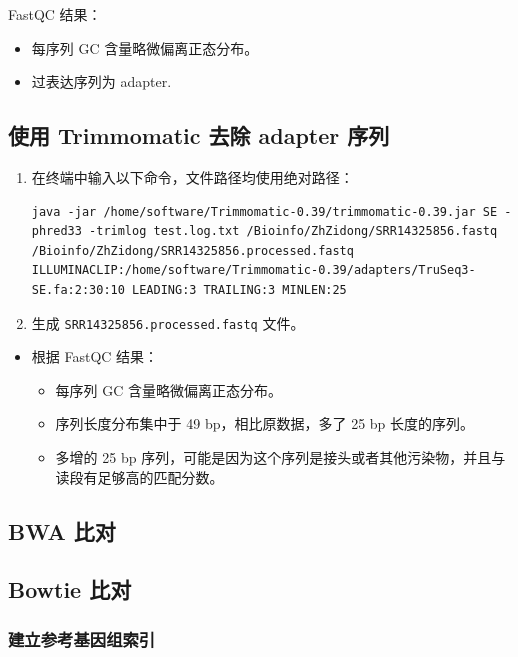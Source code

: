 \documentclass[UTF8]{ctexart}
\begin{document}
FastQC 结果：
\begin{itemize}
	\item 每序列 GC 含量略微偏离正态分布。
	\item 过表达序列为 adapter.
\end{itemize}

\subsection{ 使用 Trimmomatic 去除 adapter 序列}

\begin{enumerate}
	\item 在终端中输入以下命令，文件路径均使用绝对路径：
	\begin{lstlisting}
java -jar /home/software/Trimmomatic-0.39/trimmomatic-0.39.jar SE -phred33 -trimlog test.log.txt /Bioinfo/ZhZidong/SRR14325856.fastq /Bioinfo/ZhZidong/SRR14325856.processed.fastq ILLUMINACLIP:/home/software/Trimmomatic-0.39/adapters/TruSeq3-SE.fa:2:30:10 LEADING:3 TRAILING:3 MINLEN:25 
	\end{lstlisting}
	\item 生成 \verb|SRR14325856.processed.fastq| 文件。
\end{enumerate}

\begin{itemize}
	\item 根据 FastQC 结果：
	\begin{itemize}
		\item 每序列 GC 含量略微偏离正态分布。
		\item 序列长度分布集中于 49 bp，相比原数据，多了 25 bp 长度的序列。
		\item 多增的 25 bp 序列，可能是因为这个序列是接头或者其他污染物，并且与读段有足够高的匹配分数。
	\end{itemize}
\end{itemize}

\subsection{BWA 比对}

\subsection{Bowtie 比对}

\subsubsection{建立参考基因组索引}
\end{document}

